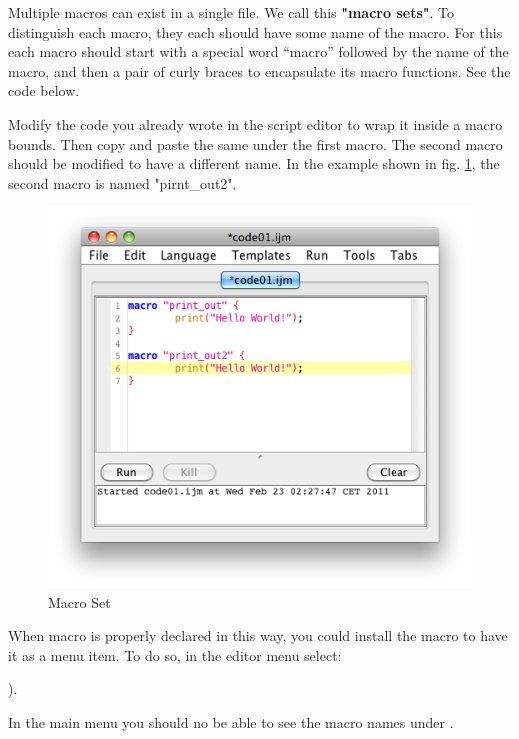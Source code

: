 \begin{indentexercise}{3}
\item Multiple macros can exist in a single file. We call this \textbf{"macro sets"}. To distinguish each macro, they each should have some name of the macro. For this each macro should start with a special word ``macro'' followed by the name of the macro, and then a pair of curly braces to encapsulate its macro functions. See the code below.  



Modify the code you already wrote in the script editor to wrap it inside a macro bounds.  Then copy and paste the same under the first macro. 
The second macro should be modified to have a different name. In the example shown in fig.
\ref{fig_MacroSetInMenu}, the second macro is named "pirnt\_out2".
\begin{figure}[htbp]
\begin{center}
\includegraphics[scale=0.6]{fig/editor_MacroSet.png}
\caption{Macro Set} \label{fig_MacroSetInMenu}
\end{center}
\end{figure}
When macro is properly declared in this way, you could install the macro to have it as a menu item. To do so, in the editor menu select: 
\begin{indentFiji}
).
\end{indentFiji}
In the main menu you should no be able to see the macro names under .


\end{indentexercise}
